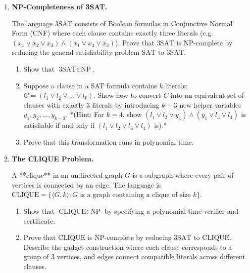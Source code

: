 \documentclass[12pt, a4paper]{book}
\begin{document}
\begin{problembox}
\begin{enumerate}[label=\textbf{P\arabic*.}]
  \item \textbf{NP-Completeness of 3SAT.}
  
        The language $\text{3SAT}$ consists of Boolean formulas in Conjunctive Normal Form (CNF) where each clause contains exactly three literals (e.g. $(x_1 \lor \overline{x}_2 \lor x_3) \land (\overline{x}_1 \lor x_4 \lor \overline{x}_3)$).
        Prove that $\text{3SAT}$ is NP-complete by reducing the general satisfiability problem $\text{SAT}$ to $\text{3SAT}$.
        \begin{enumerate}[label=(\alph*)]
          \item Show that $\text{3SAT} \in \text{NP}$.
          \item Suppose a clause in a SAT formula contains $k$ literals: $C = (l_1 \lor l_2 \lor \dots \lor l_k)$.
                Show how to convert $C$ into an equivalent set of clauses with exactly 3 literals by introducing $k-3$ new helper variables $y_1, y_2, \dots, y_{k-3}$.
                *(Hint: For $k=4$, show $(l_1 \lor l_2 \lor y_1) \land (\overline{y}_1 \lor l_3 \lor l_4)$ is satisfiable if and only if $(l_1 \lor l_2 \lor l_3 \lor l_4)$ is).*
          \item Prove that this transformation runs in polynomial time.
        \end{enumerate}

  \item \textbf{The CLIQUE Problem.}
  
        A **clique** in an undirected graph $G$ is a subgraph where every pair of vertices is connected by an edge.
        The language is $\text{CLIQUE} = \{\langle G, k \rangle : G \text{ is a graph containing a clique of size } k\}$.
        \begin{enumerate}[label=(\alph*)]
          \item Show that $\text{CLIQUE} \in \text{NP}$ by specifying a polynomial-time verifier and certificate.
          \item Prove that $\text{CLIQUE}$ is NP-complete by reducing $\text{3SAT}$ to $\text{CLIQUE}$.
                Describe the gadget construction where each clause corresponds to a group of 3 vertices, and edges connect compatible literals across different clauses.
        \end{enumerate}
\end{enumerate}
\end{problembox}
\end{document}
